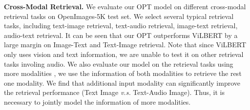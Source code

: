 \documentclass[10pt,twocolumn,letterpaper]{article}
\begin{document}
\textbf{Cross-Modal Retrieval.} We evaluate our OPT model on different cross-modal retrieval tasks on OpenImages-5K test set. We select several typical retrieval tasks, including text-image retrieval, text-audio retrieval, image-text retrieval, audio-text retrieval. It can be seen that our OPT outperforms ViLBERT \cite{lvilbert} by a large margin on Image-Text and Text-Image retrieval. Note that since ViLBERT only uses vision and text information, we are unable to test it on other retrieval tasks involing audio. We also evaluate our model on the retrieval tasks using more modalities \ie, we use the information of both modalities to retrieve the rest one modality. We find that additional input modality can significantly improve the retrieval performance (\eg Text  Image \textit{v.s.} Text-Audio  Image). Thus, it is necessary to jointly model the information of more modalities. 

\begin{table}[!t]
\begin{center}
\caption{Ablation studies of our model on multi-modal classification task.}
\label{tab:as}
\end{center}
\end{table}
\end{document}
